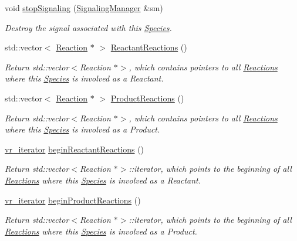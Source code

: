 \begin{DoxyCompactItemize}
void \hyperlink{group__Chemistry_ga2f6bf3f11ba5ac49b3f542d8d5c7ffd3}{stop\-Signaling} (\hyperlink{classSignalingManager}{Signaling\-Manager} \&sm)
\begin{DoxyCompactList}\small\item\em Destroy the signal associated with this \hyperlink{classSpecies}{Species}. \end{DoxyCompactList}\item 
std\-::vector$<$ \hyperlink{classReaction}{Reaction} $\ast$ $>$ \hyperlink{group__Chemistry_gab694c3af4b1470b26306776469cf1496}{Reactant\-Reactions} ()
\begin{DoxyCompactList}\small\item\em Return std\-::vector$<$\-Reaction $\ast$$>$, which contains pointers to all \hyperlink{classReaction}{Reactions} where this \hyperlink{classSpecies}{Species} is involved as a Reactant. \end{DoxyCompactList}\item 
std\-::vector$<$ \hyperlink{classReaction}{Reaction} $\ast$ $>$ \hyperlink{group__Chemistry_ga2ebcfd154efba4ba0a881f89e3a0102c}{Product\-Reactions} ()
\begin{DoxyCompactList}\small\item\em Return std\-::vector$<$\-Reaction $\ast$$>$, which contains pointers to all \hyperlink{classReaction}{Reactions} where this \hyperlink{classSpecies}{Species} is involved as a Product. \end{DoxyCompactList}\item 
\hyperlink{group__Chemistry_ga3ffcd49efdca1415b74d13f1b9fea3e4}{vr\-\_\-iterator} \hyperlink{group__Chemistry_ga2adec8a379070492b2dc48fc696b0761}{begin\-Reactant\-Reactions} ()
\begin{DoxyCompactList}\small\item\em Return std\-::vector$<$\-Reaction $\ast$$>$\-::iterator, which points to the beginning of all \hyperlink{classReaction}{Reactions} where this \hyperlink{classSpecies}{Species} is involved as a Reactant. \end{DoxyCompactList}\item 
\hyperlink{group__Chemistry_ga3ffcd49efdca1415b74d13f1b9fea3e4}{vr\-\_\-iterator} \hyperlink{group__Chemistry_ga3cdee01c4131da3814a51282be49d83b}{begin\-Product\-Reactions} ()
\begin{DoxyCompactList}\small\item\em Return std\-::vector$<$\-Reaction $\ast$$>$\-::iterator, which points to the beginning of all \hyperlink{classReaction}{Reactions} where this \hyperlink{classSpecies}{Species} is involved as a Product. \end{DoxyCompactList}\item 

\end{DoxyCompactItemize}
